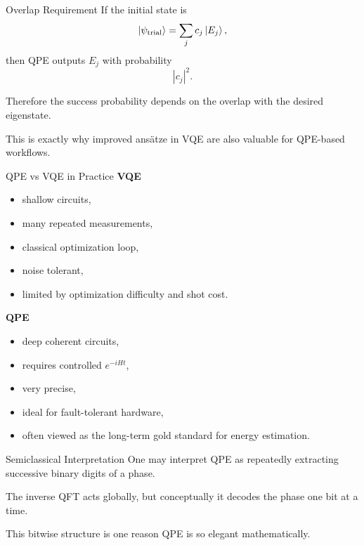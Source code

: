 \documentclass{beamer}
\begin{document}
\begin{frame}{Overlap Requirement}
If the initial state is
\[
\ket{\psi_{\mathrm{trial}}} = \sum_j c_j \ket{E_j},
\]
then QPE outputs \(E_j\) with probability
\[
|c_j|^2.
\]

Therefore the success probability depends on the overlap with the desired eigenstate.

This is exactly why improved ans\"atze in VQE are also valuable for QPE-based workflows.
\end{frame}

\begin{frame}{QPE vs VQE in Practice}
\textbf{VQE}
\begin{itemize}
\item shallow circuits,
\item many repeated measurements,
\item classical optimization loop,
\item noise tolerant,
\item limited by optimization difficulty and shot cost.
\end{itemize}

\textbf{QPE}
\begin{itemize}
\item deep coherent circuits,
\item requires controlled \(e^{-iHt}\),
\item very precise,
\item ideal for fault-tolerant hardware,
\item often viewed as the long-term gold standard for energy estimation.
\end{itemize}
\end{frame}

\begin{frame}{Semiclassical Interpretation}
One may interpret QPE as repeatedly extracting successive binary digits of a phase.

The inverse QFT acts globally, but conceptually it decodes the phase one bit at a time.

This bitwise structure is one reason QPE is so elegant mathematically.
\end{frame}
\end{document}

